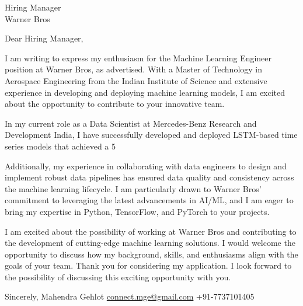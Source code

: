 \documentclass[11pt]{letter}
\begin{document}
\begin{letter}{Hiring Manager \\ Warner Bros}

Dear Hiring Manager,

I am writing to express my enthusiasm for the Machine Learning Engineer position at Warner Bros, as advertised. With a Master of Technology in Aerospace Engineering from the Indian Institute of Science and extensive experience in developing and deploying machine learning models, I am excited about the opportunity to contribute to your innovative team.

In my current role as a Data Scientist at Mercedes-Benz Research and Development India, I have successfully developed and deployed LSTM-based time series models that achieved a 5%

Additionally, my experience in collaborating with data engineers to design and implement robust data pipelines has ensured data quality and consistency across the machine learning lifecycle. I am particularly drawn to Warner Bros' commitment to leveraging the latest advancements in AI/ML, and I am eager to bring my expertise in Python, TensorFlow, and PyTorch to your projects.

I am excited about the possibility of working at Warner Bros and contributing to the development of cutting-edge machine learning solutions. I would welcome the opportunity to discuss how my background, skills, and enthusiasms align with the goals of your team. Thank you for considering my application. I look forward to the possibility of discussing this exciting opportunity with you.

Sincerely,  
Mahendra Gehlot  
\href{mailto:connect.mge@gmail.com}{connect.mge@gmail.com}  
+91-7737101405  
\end{letter}
\end{document}
